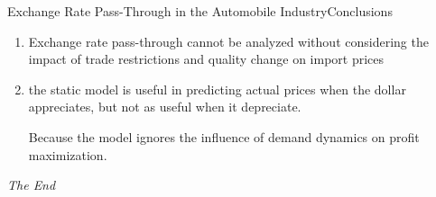 \documentclass{beamer}
\begin{document}
\begin{frame}{Exchange Rate Pass-Through in the Automobile Industry}{Conclusions}
   \begin{enumerate}
	   \item  Exchange rate pass-through cannot be
	   analyzed without considering the impact of trade restrictions and quality change
	   on import prices

	   \item the static model is useful in predicting actual prices
	   when the dollar appreciates, but not as useful when it depreciate.

	   Because the model ignores the influence of demand
	   dynamics on profit maximization.

   \end{enumerate}

\end{frame}

\begin{frame}
\Huge{\centerline{\textit{The End}}}
\end{frame}
\end{document}
